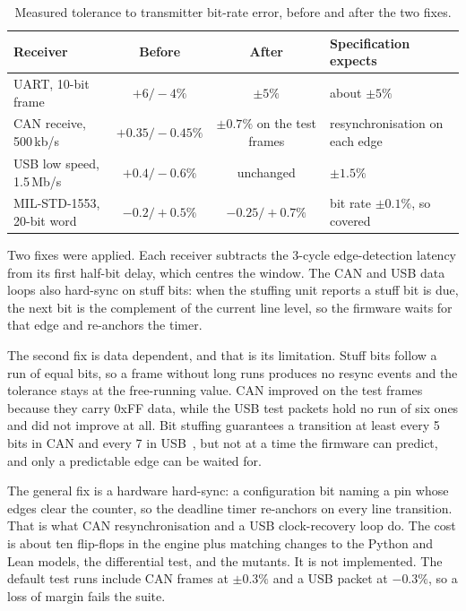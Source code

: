 \documentclass[11pt]{article}
\newcommand{\sig}[1]{\texttt{\detokenize{#1}}}
\begin{document}
\begin{table}[h]
\centering\small
\caption{Measured tolerance to transmitter bit-rate error, before and after the two fixes.}\label{tab:tol}
\begin{tabularx}{\linewidth}{@{}lccL@{}}
\toprule
Receiver & Before & After & Specification expects \\
\midrule
UART, 10-bit frame & $+6/-4\%$ & $\pm5\%$ & about $\pm5\%$ \\
CAN receive, 500\,kb/s & $+0.35/-0.45\%$ & $\pm0.7\%$ on the test frames & resynchronisation on each edge \\
USB low speed, 1.5\,Mb/s & $+0.4/-0.6\%$ & unchanged & $\pm1.5\%$ \\
MIL-STD-1553, 20-bit word & $-0.2/+0.5\%$ & $-0.25/+0.7\%$ & bit rate $\pm0.1\%$, so covered \\
\bottomrule
\end{tabularx}
\end{table}

Two fixes were applied.
Each receiver subtracts the 3-cycle edge-detection latency from its first half-bit delay, which centres the window.
The CAN and USB data loops also hard-sync on stuff bits: when the stuffing unit reports a stuff bit is due, the next bit is the complement of the current line level, so the firmware waits for that edge and re-anchors the timer.

The second fix is data dependent, and that is its limitation.
Stuff bits follow a run of equal bits, so a frame without long runs produces no resync events and the tolerance stays at the free-running value.
CAN improved on the test frames because they carry 0xFF data, while the USB test packets hold no run of six ones and did not improve at all.
Bit stuffing guarantees a transition at least every 5 bits in CAN and every 7 in USB~\cite{can,usb}, but not at a time the firmware can predict, and only a predictable edge can be waited for.

The general fix is a hardware hard-sync: a configuration bit naming a pin whose edges clear the \sig{since} counter, so the deadline timer re-anchors on every line transition.
That is what CAN resynchronisation and a USB clock-recovery loop do.
The cost is about ten flip-flops in the engine plus matching changes to the Python and Lean models, the differential test, and the mutants.
It is not implemented.
The default test runs include CAN frames at $\pm0.3\%$ and a USB packet at $-0.3\%$, so a loss of margin fails the suite.
\end{document}
